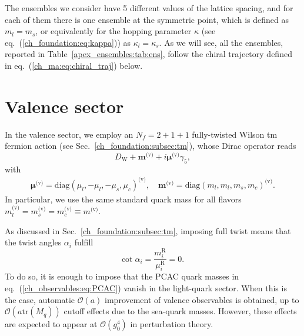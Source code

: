 The ensembles we consider have 5 different values of the lattice spacing, and for each of them there is one ensemble at the symmetric point, which is defined as $m_l=m_s$, or equivalently for the hopping parameter $\kappa$ (see eq.~(\ref{ch_foundation:eq:kappa})) as $\kappa_l=\kappa_s$. As we will see, all the ensembles, reported in Table~\ref{apex_ensembles:tab:ens}, follow the chiral trajectory defined in eq.~(\ref{ch_ma:eq:chiral_traj}) below.




\section{Valence sector}
\label{ch_ma:sec:Valence}

In the valence sector, we employ an $N_f=2+1+1$ fully-twisted Wilson tm fermion action (see Sec.~\ref{ch_foundation:subsec:tm}), whose Dirac operator reads
\begin{equation}
D_{\textrm{W}}+\boldsymbol{m}^{\textrm{(v)}}+i\boldsymbol{\mu}^{\textrm{(v)}}\gamma_5,
\end{equation}
with 
\begin{gather}
\boldsymbol{\mu}^{\textrm{(v)}}={\textrm{diag}}(\mu_l,-\mu_l,-\mu_s,\mu_c)^{\textrm{(v)}}, \quad
\boldsymbol{m}^{\textrm{(v)}}={\textrm{diag}}(m_l,m_l,m_s,m_c)^{\textrm{(v)}}.
\end{gather}
In particular, we use the same standard quark mass for all flavors $m_l^{\textrm{(v)}}=m_s^{\textrm{(v)}}=m_c^{\textrm{(v)}}\equiv m^{\textrm{(v)}}$.

As discussed in Sec.~\ref{ch_foundation:subsec:tm}, imposing full twist means that the twist angles $\alpha_i$ fulfill
\begin{equation}
{\textrm{cot}}\;\alpha_i=\frac{m_i^{\textrm{R}}}{\mu_i^{\textrm{R}}}=0.
\end{equation}
To do so, it is enough to impose that the PCAC quark masses in eq.~(\ref{ch_observables:eq:PCAC}) vanish in the light-quark sector. When this is the case, automatic $\mathcal{O}(a)$ improvement of valence observables is obtained, up to $\mathcal{O}(a\textrm{tr}\left(M_q\right))$ cutoff effects due to the sea-quark masses. However, these effects are expected to appear at $\mathcal{O}(g_0^4)$ in perturbation theory.


